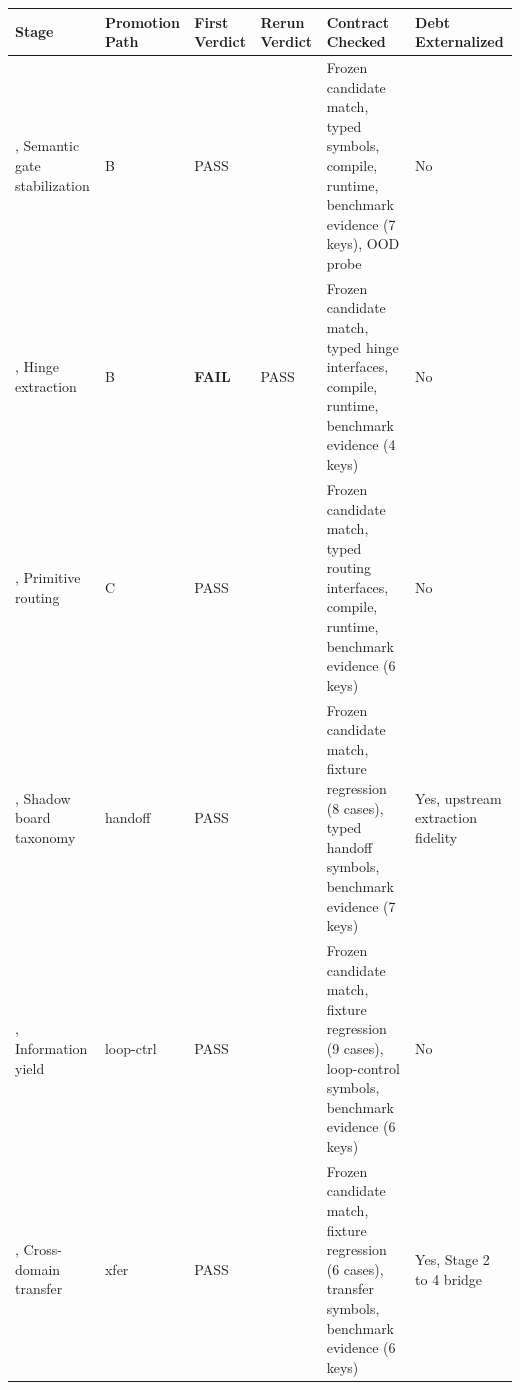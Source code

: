 \documentclass[
  11pt]{article}
\begin{document}
\begin{longtable}[]{@{}
  >{\raggedright\arraybackslash}p{}
  >{\raggedright\arraybackslash}p{}
  >{\raggedright\arraybackslash}p{}
  >{\raggedright\arraybackslash}p{}
  >{\raggedright\arraybackslash}p{}
  >{\raggedright\arraybackslash}p{}@{}}
\toprule\noalign{}
\begin{minipage}[b]{\linewidth}\raggedright
Stage
\end{minipage} & \begin{minipage}[b]{\linewidth}\raggedright
Promotion Path
\end{minipage} & \begin{minipage}[b]{\linewidth}\raggedright
First Verdict
\end{minipage} & \begin{minipage}[b]{\linewidth}\raggedright
Rerun Verdict
\end{minipage} & \begin{minipage}[b]{\linewidth}\raggedright
Contract Checked
\end{minipage} & \begin{minipage}[b]{\linewidth}\raggedright
Debt Externalized
\end{minipage} \\
\midrule\noalign{}
\endhead
\bottomrule\noalign{}
\endlastfoot
1, Semantic gate stabilization & B & PASS & & Frozen candidate match,
typed symbols, compile, runtime, benchmark evidence (7 keys), OOD probe
& No \\
2, Hinge extraction & B & \textbf{FAIL} & PASS & Frozen candidate match,
typed hinge interfaces, compile, runtime, benchmark evidence (4 keys) &
No \\
3, Primitive routing & C & PASS & & Frozen candidate match, typed
routing interfaces, compile, runtime, benchmark evidence (6 keys) &
No \\
4, Shadow board taxonomy & handoff & PASS & & Frozen candidate match,
fixture regression (8 cases), typed handoff symbols, benchmark evidence
(7 keys) & Yes, upstream extraction fidelity \\
5, Information yield & loop-ctrl & PASS & & Frozen candidate match,
fixture regression (9 cases), loop-control symbols, benchmark evidence
(6 keys) & No \\
6, Cross-domain transfer & xfer & PASS & & Frozen candidate match,
fixture regression (6 cases), transfer symbols, benchmark evidence (6
keys) & Yes, Stage 2 to 4 bridge \\
\end{longtable}
\end{document}

